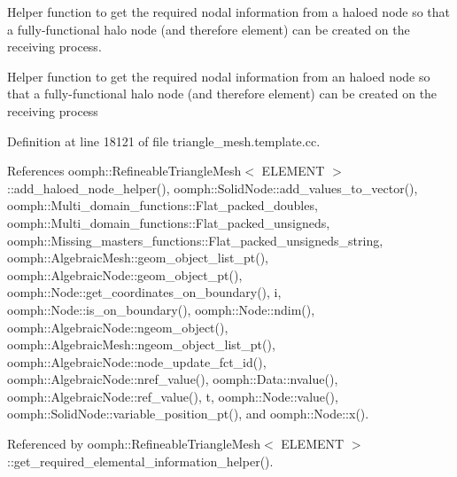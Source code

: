 Helper function to get the required nodal information from a haloed node so that a fully-\/functional halo node (and therefore element) can be created on the receiving process. 

Helper function to get the required nodal information from an haloed node so that a fully-\/functional halo node (and therefore element) can be created on the receiving process 

Definition at line 18121 of file triangle\+\_\+mesh.\+template.\+cc.



References oomph\+::\+Refineable\+Triangle\+Mesh$<$ E\+L\+E\+M\+E\+N\+T $>$\+::add\+\_\+haloed\+\_\+node\+\_\+helper(), oomph\+::\+Solid\+Node\+::add\+\_\+values\+\_\+to\+\_\+vector(), oomph\+::\+Multi\+\_\+domain\+\_\+functions\+::\+Flat\+\_\+packed\+\_\+doubles, oomph\+::\+Multi\+\_\+domain\+\_\+functions\+::\+Flat\+\_\+packed\+\_\+unsigneds, oomph\+::\+Missing\+\_\+masters\+\_\+functions\+::\+Flat\+\_\+packed\+\_\+unsigneds\+\_\+string, oomph\+::\+Algebraic\+Mesh\+::geom\+\_\+object\+\_\+list\+\_\+pt(), oomph\+::\+Algebraic\+Node\+::geom\+\_\+object\+\_\+pt(), oomph\+::\+Node\+::get\+\_\+coordinates\+\_\+on\+\_\+boundary(), i, oomph\+::\+Node\+::is\+\_\+on\+\_\+boundary(), oomph\+::\+Node\+::ndim(), oomph\+::\+Algebraic\+Node\+::ngeom\+\_\+object(), oomph\+::\+Algebraic\+Mesh\+::ngeom\+\_\+object\+\_\+list\+\_\+pt(), oomph\+::\+Algebraic\+Node\+::node\+\_\+update\+\_\+fct\+\_\+id(), oomph\+::\+Algebraic\+Node\+::nref\+\_\+value(), oomph\+::\+Data\+::nvalue(), oomph\+::\+Algebraic\+Node\+::ref\+\_\+value(), t, oomph\+::\+Node\+::value(), oomph\+::\+Solid\+Node\+::variable\+\_\+position\+\_\+pt(), and oomph\+::\+Node\+::x().



Referenced by oomph\+::\+Refineable\+Triangle\+Mesh$<$ E\+L\+E\+M\+E\+N\+T $>$\+::get\+\_\+required\+\_\+elemental\+\_\+information\+\_\+helper().

\mbox{\label{classoomph_1_1RefineableTriangleMesh_a96166ff7172e5ea1ba299ffb65d462bc}} 
